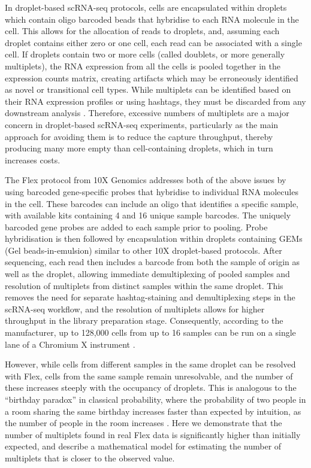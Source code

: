 \documentclass[unnumsec,webpdf,modern,large]{oup-authoring-template}
\begin{document}
	In droplet-based scRNA-seq protocols, cells are encapsulated within droplets which contain oligo barcoded beads that hybridise to each RNA molecule in the cell. 
	This allows for the allocation of reads to droplets, and, assuming each droplet contains either zero or one cell, each read can be associated with a single cell. 
	If droplets contain two or more cells (called doublets, or more generally multiplets), the RNA expression from all the cells is pooled together in the expression counts matrix, creating artifacts which may be erroneously identified as novel or transitional cell types. 
	While multiplets can be identified based on their  RNA expression profiles or using hashtags, they must be discarded from any downstream analysis
	\citep{Neavin2024}.
	Therefore, excessive numbers of multiplets are a major concern in droplet-based scRNA-seq experiments, particularly as the main approach for  avoiding them is to reduce the capture throughput, thereby producing many more empty than cell-containing droplets, which in turn increases costs.
	
	The Flex protocol from 10X Genomics addresses both of the above issues by using barcoded gene-specific probes that hybridise to individual RNA molecules in the cell. 
	These barcodes can include an oligo that identifies a specific sample, with available kits containing 4 and 16 unique sample barcodes. 
	The uniquely barcoded gene probes are added to each sample prior to pooling. 
	Probe hybridisation is then followed by encapsulation within droplets containing GEMs (Gel beads-in-emulsion) similar to other 10X droplet-based protocols. 
	After sequencing, each read then includes a barcode from both the sample of origin as well as the droplet, allowing immediate demultiplexing of pooled samples and resolution of multiplets from distinct samples within the same droplet. 
	This removes the need for separate hashtag-staining and demultiplexing steps in the scRNA-seq workflow, and the resolution of multiplets allows for higher throughput in the library preparation stage. 
	Consequently, according to the manufacturer, up to 128,000 cells from up to 16 samples can be run on a single lane of a Chromium X instrument 
	\citep{10X_flex_protocol}. 
	
	However, while cells from different samples in the same droplet can be resolved with Flex, cells from the same sample remain unresolvable, and the number of these increases steeply with the occupancy of droplets. 
	This is analogous to the ``birthday paradox” in classical probability, where the probability of two people in a room sharing the same birthday increases faster than expected by intuition, as the number of people in the room increases
	\citep{Mulqueen2021}.
	Here we demonstrate that the number of multiplets found in real Flex data is significantly higher than initially expected, and describe a mathematical model for estimating the number of multiplets that is closer to the observed value. 
\end{document}
